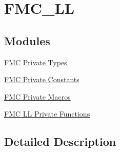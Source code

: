\hypertarget{group___f_m_c___l_l}{}\section{F\+M\+C\+\_\+\+LL}
\label{group___f_m_c___l_l}
\subsection*{Modules}
\begin{DoxyCompactItemize}
\item 
\hyperlink{group___f_m_c___l_l___private___types}{F\+M\+C Private Types}
\item 
\hyperlink{group___f_m_c___l_l___private___constants}{F\+M\+C Private Constants}
\item 
\hyperlink{group___f_m_c___l_l___private___macros}{F\+M\+C Private Macros}
\item 
\hyperlink{group___f_m_c___l_l___private___functions}{F\+M\+C L\+L Private Functions}
\end{DoxyCompactItemize}


\subsection{Detailed Description}
